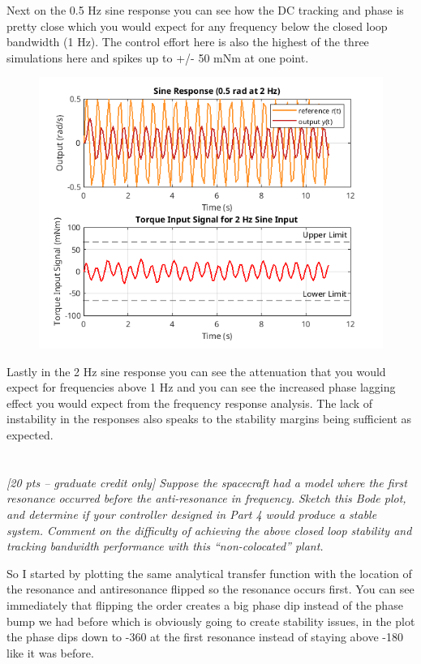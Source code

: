 \documentclass{article}
\begin{document}
Next on the 0.5 Hz sine response you can see how the DC tracking and phase is pretty close which you would expect for any frequency below the closed loop bandwidth (1 Hz).
The control effort here is also the highest of the three simulations here and spikes up to +/- 50 mNm at one point.

\begin{figure}[H]
    \centering
    \includegraphics[width=\textwidth]{twoSineResponse.png}
    \label{fig:twoSineResponse}
\end{figure}

Lastly in the 2 Hz sine response you can see the attenuation that you would expect for frequencies above 1 Hz and you can see the increased phase lagging effect you would expect from the frequency response analysis.
The lack of instability in the responses also speaks to the stability margins being sufficient as expected.

\section{}

\textit{[20 pts – graduate credit only] Suppose the spacecraft had a model where the first resonance occurred before the anti-resonance in frequency. Sketch this Bode plot, and determine if your controller designed in Part 4 would produce a stable system. Comment on the difficulty of achieving the above closed loop stability and tracking bandwidth performance with this “non-colocated” plant.}

So I started by plotting the same analytical transfer function with the location of the resonance and antiresonance flipped so the resonance occurs first.
You can see immediately that flipping the order creates a big phase dip instead of the phase bump we had before which is obviously going to create stability issues, in the plot the phase dips down to -360 at the first resonance instead of staying above -180 like it was before.
\end{document}
